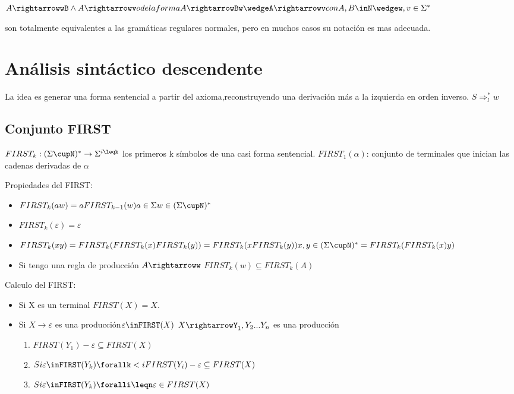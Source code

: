$A\rightarrowwB \wedge A\rightarrowv o de la forma A\rightarrowBw \wedgeA\rightarrowv con A,B\inN \wedgew,v\in\Sigma^{*}$

son totalmente equivalentes a las gramáticas regulares normales, pero en muchos casos su notación es mas adecuada.

\section{Análisis sintáctico descendente}

La idea es generar una forma sentencial a partir del axioma,reconstruyendo una derivación más a la izquierda en orden inverso. $S\Rightarrow_{l}^{*}w$

\subsection{Conjunto FIRST}

$FIRST_{k}:(\Sigma\cupN)^{*}\rightarrow\Sigma^{i\leqk}$ los primeros k símbolos de una casi forma sentencial.
$FIRST_{1}(\alpha)$: conjunto de terminales que inician las cadenas derivadas de $\alpha$

Propiedades del FIRST:
\begin{itemize}
	\item $FIRST_{k}(aw)=a FIRST_{k-1}(w)  a\in\Sigma   w\in(\Sigma\cupN)^{*}$
	\item $FIRST_{k}(\varepsilon)={\varepsilon}$
	\item $FIRST_{k}(xy) = FIRST_{k}(FIRST_{k}(x)FIRST_{k}(y)) =
	FIRST_{k}(x FIRST_{k}(y))  x,y\in(\Sigma\cupN)^{*} =FIRST_{k}(FIRST_{k}(x)y)$
	\item  Si tengo una regla de producción $A\rightarroww$ 
	$FIRST_{k}(w)\subseteq FIRST_{k}(A)$
\end{itemize}

Calculo del FIRST:
\begin{itemize}
	\item Si X es un terminal $FIRST(X)={X}$.
	\item Si $X\rightarrow\varepsilon$ es una producción$\varepsilon\inFIRST(X)$
	\itemSi $X\rightarrowY_{1},Y_{2}...Y_{n}$ es una producción
	\begin{enumerate}
	\item $FIRST(Y_{1})-{\varepsilon}\subseteq FIRST(X)$
	\item $Si \varepsilon\inFIRST(Y_{k})\forallk<i FIRST(Y_{i})-{\varepsilon}\subseteq FIRST(X) $
	\item $Si \varepsilon\inFIRST(Y_{k})\foralli\leqn \varepsilon \in FIRST(X) $
	\end{enumerate}
\end{itemize}

